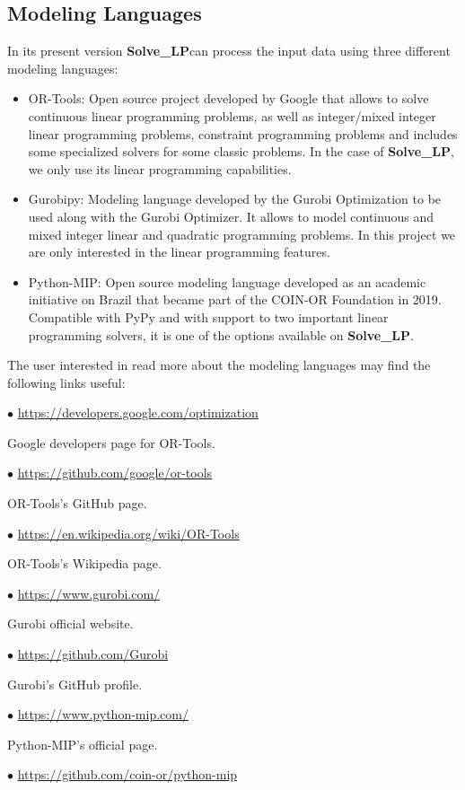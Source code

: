 \documentclass[12pt,hidelinks]{article}
\newcommand{\SolveLP}{\textbf{Solve\_LP}}
\begin{document}
	\subsection{Modeling Languages}
			In its present version \SolveLP can process the input data using three different modeling languages:
			\begin{itemize}
				\item OR-Tools: Open source project developed by Google that allows to solve continuous linear programming problems, as well as integer/mixed integer linear programming problems, constraint programming problems and includes some specialized solvers for some classic problems. In the case of \SolveLP, we only use its linear programming capabilities.
				\item Gurobipy: Modeling language developed by the Gurobi Optimization to be used along with the Gurobi Optimizer. It allows to model continuous and mixed integer linear and quadratic programming problems. In this project we are only interested in the linear programming features.
				\item Python-MIP: Open source modeling language developed as an academic initiative on Brazil that became part of the COIN-OR Foundation in 2019. Compatible with PyPy and with support to two important linear programming solvers, it is one of the options available on \SolveLP.
			\end{itemize}
			The user interested in read more about the modeling languages may find the following links useful:

			$\bullet$ \url{https://developers.google.com/optimization}

			Google developers page for OR-Tools.

			$\bullet$ \url{https://github.com/google/or-tools}

			OR-Tools's GitHub page.

			$\bullet$ \url{https://en.wikipedia.org/wiki/OR-Tools}

			OR-Tools's Wikipedia page.

			$\bullet$ \url{https://www.gurobi.com/}

			Gurobi official website.

			$\bullet$ \url{https://github.com/Gurobi}

			Gurobi's GitHub profile.

			$\bullet$ \url{https://www.python-mip.com/}

			Python-MIP's official page.

			$\bullet$ \url{https://github.com/coin-or/python-mip}
\end{document}
